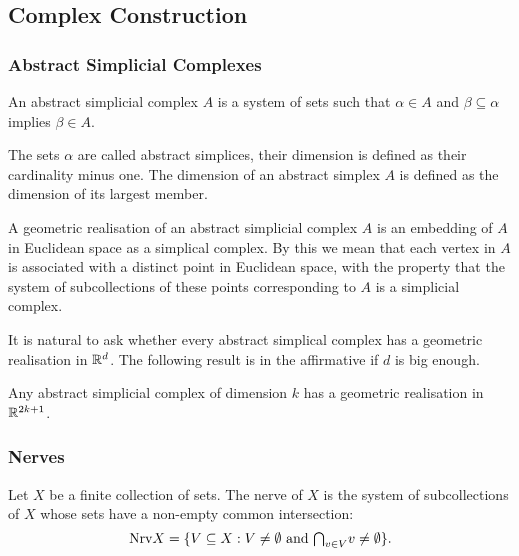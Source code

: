 \subsection{Complex Construction}


\subsubsection{Abstract Simplicial Complexes}

\begin{definition}
An abstract simplicial complex $A$ is a system of sets such that $\alpha \in A$ and $\beta \subseteq \alpha$ implies $\beta \in A$.
\end{definition}

The sets $\alpha$ are called abstract simplices, their dimension is defined as their cardinality minus one. The dimension of an abstract simplex $A$ is defined as the dimension of its largest member.

\begin{definition}
A geometric realisation of an abstract simplicial complex $A$ is an embedding of $A$ in Euclidean space as a simplical complex. By this we mean that each vertex in $A$ is associated with a distinct point in Euclidean space, with the property that the system of subcollections of these points corresponding to $A$ is a simplicial complex.
\end{definition}

It is natural to ask whether every abstract simplical complex has a geometric realisation in $\mathbb{R}^d$. The following result is in the affirmative if $d$ is big enough.

\begin{theorem}
Any abstract simplicial complex of dimension $k$ has a geometric realisation in $\mathbb{R}^{2k+1}$.
\end{theorem}


\subsubsection{Nerves}

\begin{definition}
Let $X$ be a finite collection of sets. The nerve of $X$ is the system of subcollections of $X$ whose sets have a non-empty common intersection:
$$
\nrv X = \{V \subseteq X : V \not= \emptyset \text{ and } \mathsmaller{\bigcap}_{v \in V} v \not= \emptyset\}.
$$
\end{definition}

